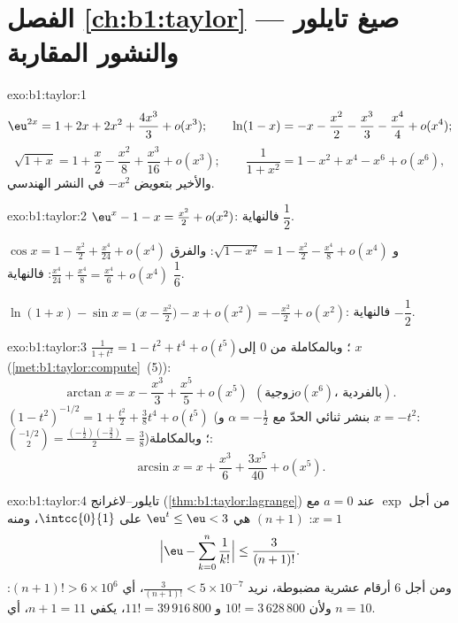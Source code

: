 \section*{الفصل \ref{ch:b1:taylor} --- صيغ تايلور والنشور
المقاربة}

\begin{solution}{exo:b1:taylor:1}
\[
\eu^{2x} = 1 + 2x + 2x^2 + \frac{4x^3}{3} + o(x^3);
\qquad
\ln(1 - x) = -x - \frac{x^2}{2} - \frac{x^3}{3} - \frac{x^4}{4} +
o(x^4);
\]
\[
\sqrt{1+x} = 1 + \frac x2 - \frac{x^2}{8} + \frac{x^3}{16} + o(x^3);
\qquad
\frac{1}{1 + x^2} = 1 - x^2 + x^4 - x^6 + o(x^6),
\]
والأخير بتعويض $-x^2$ في النشر الهندسي.
\end{solution}

\begin{solution}{exo:b1:taylor:2}
$\eu^x - 1 - x = \frac{x^2}{2} + o(x^2)$: فالنهاية $\dfrac12$.

$\cos x = 1 - \frac{x^2}{2} + \frac{x^4}{24} + o(x^4)$ و
$\sqrt{1 - x^2} = 1 - \frac{x^2}{2} - \frac{x^4}{8} + o(x^4)$:
والفرق $\frac{x^4}{24} + \frac{x^4}{8} = \frac{x^4}{6} + o(x^4)$:
فالنهاية $\dfrac16$.

$\ln(1+x) - \sin x = \bigl(x - \frac{x^2}{2}\bigr) - x + o(x^2) =
-\frac{x^2}{2} + o(x^2)$: فالنهاية $-\dfrac12$.
\end{solution}

\begin{solution}{exo:b1:taylor:3}
$\frac{1}{1+t^2} = 1 - t^2 + t^4 + o(t^5)$؛ وبالمكاملة من $0$ إلى
$x$ (\cref{met:b1:taylor:compute}~(5)):
\[
\arctan x = x - \frac{x^3}{3} + \frac{x^5}{5} + o(x^5)\ \ (\text{زوجية
}o(x^6)\text{، بالفردية}).
\]
$(1 - t^2)^{-1/2} = 1 + \frac{t^2}{2} + \frac38 t^4 + o(t^5)$ (بنشر ثنائي
الحدّ مع $\alpha = -\frac12$ و $x = -t^2$:
$\binom{-1/2}{2} = \frac{(-\frac12)(-\frac32)}{2} = \frac38$)؛
وبالمكاملة:
\[
\arcsin x = x + \frac{x^3}{6} + \frac{3x^5}{40} + o(x^5) .
\]
\end{solution}

\begin{solution}{exo:b1:taylor:4}
تايلور--لاغرانج (\cref{thm:b1:taylor:lagrange}) من أجل $\exp$ عند $a =
0$ مع $x = 1$:  $(n+1)$ هي $\eu^t \leq \eu < 3$ على
$\intcc{0}{1}$، ومنه
\[
\Bigl|\eu - \sum_{k=0}^{n} \frac{1}{k!}\Bigr| \leq
\frac{3}{(n+1)!} .
\]
ومن أجل $6$ أرقام عشرية مضبوطة، نريد $\frac{3}{(n+1)!} < 5\times 10^{-7}$،
أي $(n+1)! > 6\times 10^{6}$: ولأن $10! = 3\,628\,800$ و $11! =
39\,916\,800$، يكفي $n + 1 = 11$، أي $n = 10$.
\end{solution}


